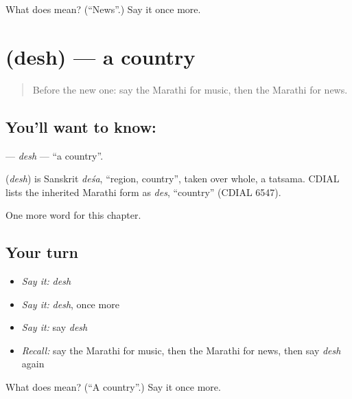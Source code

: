 \begin{tcolorbox}[breakable,colback=teal!4,colframe=teal!35!black,title={Before you move on}]
What does  mean? (\textquotedblleft{}News\textquotedblright{}.) Say it once more.
\end{tcolorbox}
\section[\texorpdfstring{\mr{देश} (desh)}{देश (desh)}]{ (desh) — a country}

\label{lesson:MR-C120-desh}



\begin{quote}
Before the new one: say the Marathi for music, then the Marathi for news.
\end{quote}

\subsection*{You'll want to know: }
\textbf{} — \emph{desh} — \textquotedblleft{}a country\textquotedblright{}.

\begin{cousinweb}
\textbf{} (\emph{desh}) is Sanskrit \emph{deśa}, \textquotedblleft{}region, country\textquotedblright{}, taken over whole, a tatsama. CDIAL lists the inherited Marathi form as \emph{des}, \textquotedblleft{}country\textquotedblright{} (CDIAL 6547).
\end{cousinweb}

\begin{grammarlens}[title={What you've built}]
One more word for this chapter.
\end{grammarlens}

\subsection*{Your turn}
\begin{itemize}
\raggedright
  \item \emph{Say it:} \emph{desh}
  \item \emph{Say it:} \emph{desh}, once more
  \item \emph{Say it:} say \emph{desh}
  \item \emph{Recall:} say the Marathi for music, then the Marathi for news, then say \emph{desh} again
\end{itemize}

\begin{tcolorbox}[breakable,colback=teal!4,colframe=teal!35!black,title={Before you move on}]
What does  mean? (\textquotedblleft{}A country\textquotedblright{}.) Say it once more.
\end{tcolorbox}
